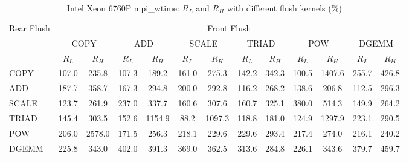 \begin{table}[htbp]
\centering
\caption{Intel Xeon 6760P mpi\_wtime: $R_L$ and $R_H$ with different flush kernels (\%)}
\label{tab:frkern-cgnr6760pn2-mpi_wtime}
\begin{tabular*}{\textwidth}{@{\extracolsep{\fill}}lcccccccccccc}
\toprule
\multirow{3}{*}{Rear Flush} & \multicolumn{12}{c}{Front Flush} \\ \cmidrule(lr){2-13}
& \multicolumn{2}{c}{COPY} & \multicolumn{2}{c}{ADD} & \multicolumn{2}{c}{SCALE} & \multicolumn{2}{c}{TRIAD} & \multicolumn{2}{c}{POW} & \multicolumn{2}{c}{DGEMM} \\ \cmidrule(lr){2-3} \cmidrule(lr){4-5} \cmidrule(lr){6-7} \cmidrule(lr){8-9} \cmidrule(lr){10-11} \cmidrule(lr){12-13}
& $R_L$ & $R_H$ & $R_L$ & $R_H$ & $R_L$ & $R_H$ & $R_L$ & $R_H$ & $R_L$ & $R_H$ & $R_L$ & $R_H$ \\ \midrule
COPY & 107.0 & 235.8 & 107.3 & 189.2 & 161.0 & 275.3 & 142.2 & 342.3 & 100.5 & 1407.6 & 255.7 & 426.8 \\
ADD & 187.7 & 358.7 & 167.3 & 294.8 & 200.0 & 292.8 & 116.2 & 268.2 & 138.6 & 206.8 & 112.5 & 296.3 \\
SCALE & 123.7 & 261.9 & 237.0 & 337.7 & 160.6 & 307.6 & 160.7 & 325.1 & 380.0 & 514.3 & 149.9 & 264.2 \\
TRIAD & 145.4 & 303.5 & 152.6 & 1154.9 & 88.2 & 1097.3 & 118.8 & 181.0 & 124.9 & 1297.9 & 223.1 & 290.5 \\
POW & 206.0 & 2578.0 & 171.5 & 256.3 & 218.1 & 229.6 & 229.6 & 293.4 & 217.4 & 274.0 & 216.1 & 240.2 \\
DGEMM & 225.8 & 343.0 & 402.0 & 391.3 & 369.0 & 362.5 & 313.6 & 284.8 & 226.1 & 343.6 & 379.7 & 459.7 \\
\bottomrule
\end{tabular*}
\end{table}